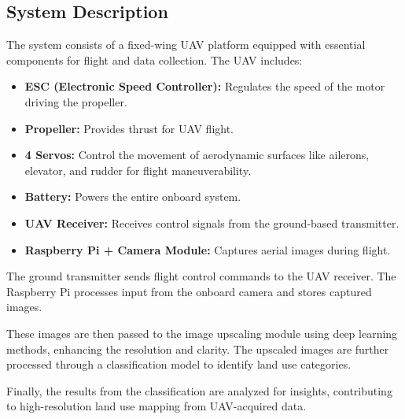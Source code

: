 \subsection{System Description}

The system consists of a fixed-wing UAV platform equipped with essential components for flight and data collection. The UAV includes:

\begin{itemize}
    \item \textbf{ESC (Electronic Speed Controller):} Regulates the speed of the motor driving the propeller.
    \item \textbf{Propeller:} Provides thrust for UAV flight.
    \item \textbf{4 Servos:} Control the movement of aerodynamic surfaces like ailerons, elevator, and rudder for flight maneuverability.
    \item \textbf{Battery:} Powers the entire onboard system.
    \item \textbf{UAV Receiver:} Receives control signals from the ground-based transmitter.
    \item \textbf{Raspberry Pi + Camera Module:} Captures aerial images during flight.
\end{itemize}

The ground transmitter sends flight control commands to the UAV receiver. The Raspberry Pi processes input from the onboard camera and stores captured images.

These images are then passed to the image upscaling module using deep learning methods, enhancing the resolution and clarity. The upscaled images are further processed through a classification model to identify land use categories.

Finally, the results from the classification are analyzed for insights, contributing to high-resolution land use mapping from UAV-acquired data.
